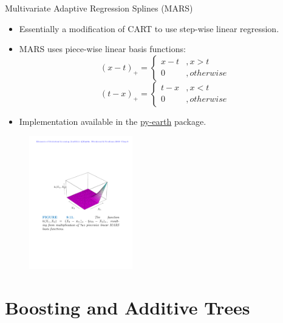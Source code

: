 \documentclass{beamer}
\begin{document}
\begin{frame}{Multivariate Adaptive Regression Splines (MARS)}
    \begin{itemize}
        \item Essentially a modification of CART to use step-wise linear regression.
        \item MARS uses piece-wise linear basis functions:
        \begin{equation*}
            (x - t)_+ = \left\{
  \begin{array}{lr}
    x - t &, x > t\\
    0 &, otherwise
  \end{array}
\right.
        \end{equation*}
        \begin{equation*}
            (t - x)_+ = \left\{
  \begin{array}{lr}
    t - x &, x < t\\
    0 &, otherwise
  \end{array}
\right.
        \end{equation*}
        \item Implementation available in the \href{https://contrib.scikit-learn.org/py-earth/index.html}{py-earth} package.
    \end{itemize}
    \begin{figure}
    \centering
    \includegraphics[width=0.4\textwidth]{figures/MARS.pdf}
\end{figure}
\end{frame}


\section{Boosting and Additive Trees}
\end{document}
